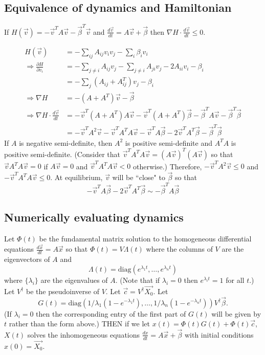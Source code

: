 \documentclass{article}
\begin{document}
\subsection{Equivalence of dynamics and Hamiltonian }
\begin{claim}
If $H(\vec{v})=-\vec{v}^TA\vec{v}-\vec{\beta}^T\vec{v}$ and $\frac{d\vec{v}}{dt}=A\vec{v}+\vec{\beta}$ then $\nabla H\cdot \frac{d\vec{v}}{dt}\leq 0$.
\end{claim}
\begin{pf}
\begin{align*}
H(\vec{v})&=-\sum_{ij}A_{ij}v_iv_j-\sum_i\beta_iv_i
\\\Rightarrow\frac{\partial H}{\partial v_i}&=-\sum_{j\neq i}A_{ij}v_j-\sum_{j\neq i}A_{ji}v_j-2A_{ii}v_i-\beta_i
\\&=-\sum_j(A_{ij}+A^T_{ij})v_j-\beta_i
\\ \Rightarrow \nabla H&=-(A+A^T)\vec{v}-\vec{\beta}
\\ \Rightarrow \nabla H\cdot \frac{d\vec{v}}{dt}&=-\vec{v}^T(A+A^T)A\vec{v}-\vec{v}^T(A+A^T)\vec{\beta}-\vec{\beta}^TA\vec{v}-\vec{\beta}^T\vec{\beta}
\\&=-\vec{v}^TA^2\vec{v}-\vec{v}^TA^TA\vec{v}-\vec{v}^TA\vec{\beta}-2\vec{v}^TA^T\vec{\beta}-\vec{\beta}^T\vec{\beta}
\end{align*}
If $A$ is negative semi-definite, then $A^2$ is positive semi-definite and $A^TA$ is positive semi-definite.  (Consider that $\vec{v}^TA^TA\vec{v}=(A\vec{v})^T(A\vec{v})$ so that $\vec{v}A^TA\vec{v}=0$ if $A\vec{v}=0$ and $\vec{v}^TA^TA\vec{v}<0$ otherwise.) Therefore, $-\vec{v}^TA^2\vec{v}\leq 0$ and $-\vec{v}^TA^TA\vec{v}\leq 0$. At equilibrium, $\vec{v}$ will be ``close" to $\vec{\beta}$ so that $$-\vec{v}^TA\vec{\beta}-2\vec{v}^TA^T\vec{\beta}\sim-\vec{\beta}^TA\vec{\beta}$$
\end{pf}

\subsection{Numerically evaluating dynamics }
\begin{claim}
Let $\Phi(t)$ be the fundamental matrix solution to the homogeneous differential equations $\frac{d\vec{x}}{dt}=A\vec{x}$ so that $\Phi(t)=V\Lambda(t)$ where the columns of $V$ are the eigenvectors of $A$ and $$\Lambda(t)=\text{diag}(e^{\lambda_1 t},\dots,e^{\lambda_n t})$$ where $\{\lambda_i\}$ are the eigenvalues of $A$.  (Note that if $\lambda_i=0$ then $e^{\lambda _i t}=1$ for all $t$.) Let $V^\dagger$ be the pseudoinverse of $V$.  Let $\vec{c}=V^\dagger\vec{X_0}$.  Let $$G(t)=\text{diag}(1/\lambda_1(1-e^{-\lambda_1t}),\dots,1/\lambda_n(1-e^{-\lambda_nt}))V^\dagger\vec{\beta}.$$
(If $\lambda_i=0$ then the corresponding entry of the first part of $G(t)$ will be given by $t$ rather than the form above.)  THEN if we let $x(t)=\Phi(t)G(t)+\Phi(t)\vec{c}$, $X(t)$ solves the inhomogeneous equations $\frac{dx}{dt}=A\vec{x}+\vec{\beta}$ with initial conditions $x(0)=\vec{X_0}$.
\end{claim}
\end{document}
